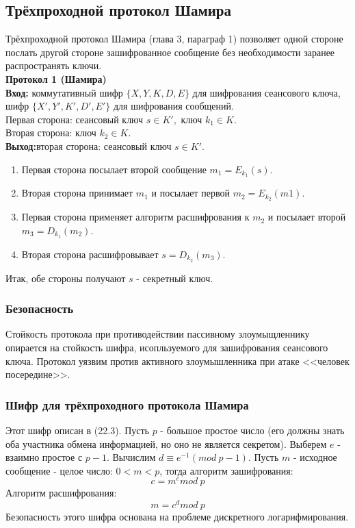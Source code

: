 
\subsection{Трёхпроходной протокол Шамира}
Трёхпроходной протокол Шамира \autocite{Shnayer}(глава 3, параграф 1) позволяет одной стороне послать другой стороне зашифрованное сообщение без необходимости заранее распространять ключи.\\
\textbf{Протокол 1 (Шамира)}\\
\hspace*{10mm}\textbf{Вход:} коммутативный шифр $\{X, Y, K, D, E\}$ для шифрования сеансового ключа, шифр $\{X', Y', K', D', E'\}$ для шифрования сообщений.\\
Первая сторона: сеансовый ключ $s\in K',$ ключ $k_{1}\in K.$\\
Вторая сторона: ключ $k_{2}\in K$.\\
\hspace*{10mm}\textbf{Выход:}вторая сторона: сеансовый ключ $s\in K'$.
\begin{enumerate}
	\item Первая сторона посылает второй сообщение $m_{1} = E_{k_{1}}(s).$
	\item Вторая сторона принимает $m_{1}$ и посылает первой $m_{2} = E_{k_{2}}(m1)$.
	\item Первая сторона применяет алгоритм расшифрования к $m_{2}$ и посылает второй $m_{3} = D_{k_{1}}(m_{2})$.
	\item Вторая сторона расшифровывает $s = D_{k_{2}}(m_{3})$.
\end{enumerate}
Итак, обе стороны получают $s$ - секретный ключ.
\subsubsection{Безопасность}
Стойкость протокола при противодействии пассивному злоумыщленнику опирается на стойкость шифра, исопльзуемого для зашифрования сеансового ключа. Протокол уязвим против активного злоумышленника при атаке <<человек посередине>>.
\subsubsection{Шифр для трёхпроходного протокола Шамира}
Этот шифр описан в \cite{Shnayer}(22.3). Пусть $p$ - большое простое число (его должны знать оба участника обмена информацией, но оно не является секретом). Выберем $e$ - взаимно простое с $p-1$. Вычислим $d \equiv e^{-1}(mod\ p-1)$. Пусть $m$ - исходное сообщение - целое число: $0<m<p$, тогда алгоритм зашифрования:
$$c=m^{e}mod\ p$$
Алгоритм расшифрования:
$$m=c^{d}mod\ p$$
Безопасность этого шифра основана на проблеме дискретного логарифмирования.
